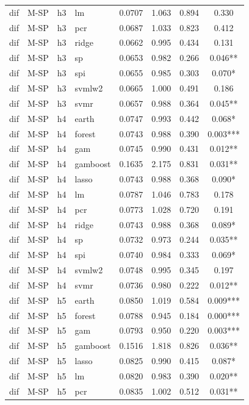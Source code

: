 \begin{ThreePartTable}
\begin{longtable}[t]{llclcccc}
dif & M-SP & h3 & lm & 0.0707 & 1.063 & 0.894 & 0.330\\
dif & M-SP & h3 & pcr & 0.0687 & 1.033 & 0.823 & 0.412\\
dif & M-SP & h3 & ridge & 0.0662 & 0.995 & 0.434 & 0.131\\
dif & M-SP & h3 & sp & 0.0653 & 0.982 & 0.266 & 0.046**\\
dif & M-SP & h3 & spi & 0.0655 & 0.985 & 0.303 & 0.070*\\
dif & M-SP & h3 & svmlw2 & 0.0665 & 1.000 & 0.491 & 0.186\\
dif & M-SP & h3 & svmr & 0.0657 & 0.988 & 0.364 & 0.045**\\
\addlinespace
dif & M-SP & h4 & earth & 0.0747 & 0.993 & 0.442 & 0.068*\\
dif & M-SP & h4 & forest & 0.0743 & 0.988 & 0.390 & 0.003***\\
dif & M-SP & h4 & gam & 0.0745 & 0.990 & 0.431 & 0.012**\\
dif & M-SP & h4 & gamboost & 0.1635 & 2.175 & 0.831 & 0.031**\\
dif & M-SP & h4 & lasso & 0.0743 & 0.988 & 0.368 & 0.090*\\
dif & M-SP & h4 & lm & 0.0787 & 1.046 & 0.783 & 0.178\\
dif & M-SP & h4 & pcr & 0.0773 & 1.028 & 0.720 & 0.191\\
dif & M-SP & h4 & ridge & 0.0743 & 0.988 & 0.368 & 0.089*\\
dif & M-SP & h4 & sp & 0.0732 & 0.973 & 0.244 & 0.035**\\
dif & M-SP & h4 & spi & 0.0740 & 0.984 & 0.333 & 0.069*\\
dif & M-SP & h4 & svmlw2 & 0.0748 & 0.995 & 0.345 & 0.197\\
dif & M-SP & h4 & svmr & 0.0736 & 0.980 & 0.222 & 0.012**\\
\addlinespace
dif & M-SP & h5 & earth & 0.0850 & 1.019 & 0.584 & 0.009***\\
dif & M-SP & h5 & forest & 0.0788 & 0.945 & 0.184 & 0.000***\\
dif & M-SP & h5 & gam & 0.0793 & 0.950 & 0.220 & 0.003***\\
dif & M-SP & h5 & gamboost & 0.1516 & 1.818 & 0.826 & 0.036**\\
dif & M-SP & h5 & lasso & 0.0825 & 0.990 & 0.415 & 0.087*\\
dif & M-SP & h5 & lm & 0.0820 & 0.983 & 0.390 & 0.020**\\
dif & M-SP & h5 & pcr & 0.0835 & 1.002 & 0.512 & 0.031**\\

\end{longtable}
\end{ThreePartTable}

